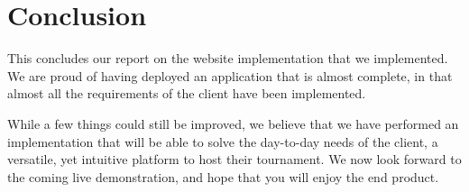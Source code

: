 \section{Conclusion}
\label{sec:Conclusion}


This concludes our report on the website implementation that we implemented. 
We are proud of having deployed an application that is almost complete, 
in that almost all the requirements of the client have been implemented. \newline

While a few things could still be improved, we believe that we have performed
an implementation that will be able to solve the day-to-day needs of the
client, a versatile, yet intuitive platform to host their
tournament. We now look forward to the coming live demonstration, and hope that
you will enjoy the end product.